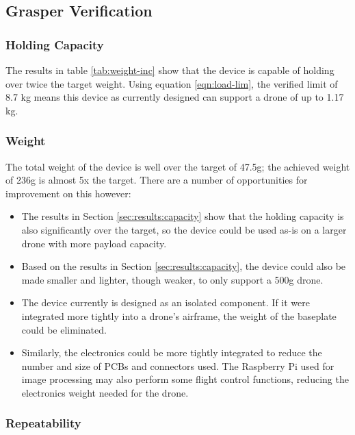 \subsection{Grasper Verification}

\subsubsection{Holding Capacity}

The results in table \ref{tab:weight-inc} show that the device is capable of holding
over twice the target weight. Using equation \ref{eqn:load-lim}, the verified 
limit of 8.7 kg means this device as currently designed can support a drone of up to 1.17 kg.


\subsubsection{Weight}

The total weight of the device is well over the target of 47.5g; the achieved weight of
236g is almost 5x the target. There are a number of opportunities for improvement on this
however: 

\begin{itemize}
    \item The results in Section \ref{sec:results:capacity} show that the holding capacity 
        is also significantly over the target, so the device could be used as-is on a larger drone with 
        more payload capacity.
    \item Based on the results in Section \ref{sec:results:capacity}, the device could also be made
        smaller and lighter, though weaker, to only support a 500g drone.
    \item The device currently is designed as an isolated component. If it were integrated more tightly
        into a drone's airframe, the weight of the baseplate could be eliminated.
    \item Similarly, the electronics could be more tightly integrated to reduce the number and size of
        PCBs and connectors used. The Raspberry Pi used for image processing may also perform some flight
        control functions, reducing the electronics weight needed for the drone.
\end{itemize}


\subsubsection{Repeatability}

